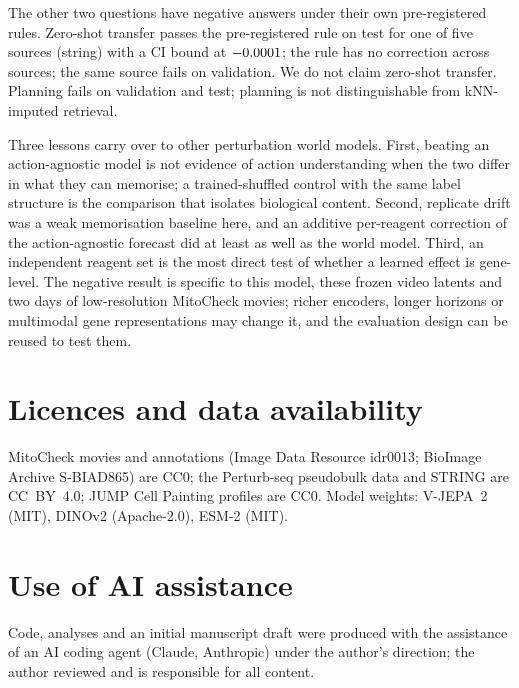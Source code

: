 The other two questions have negative answers under their own pre-registered rules. Zero-shot
transfer passes the pre-registered rule on test for one of five sources (string) with a CI bound
at $-0.0001$; the rule has no correction across sources; the same source fails
on validation. We do not claim zero-shot transfer. Planning fails on validation and test;
planning is not distinguishable from kNN-imputed retrieval.

Three lessons carry over to other perturbation world models. First, beating an action-agnostic
model is not evidence of action understanding when the two differ in what they can memorise; a
trained-shuffled control with the same label structure is the comparison that isolates
biological content. Second, replicate drift was a weak memorisation baseline here, and an
additive per-reagent correction of the action-agnostic forecast did at least as well as the
world model. Third, an independent reagent set is the most direct test of whether a learned
effect is gene-level. The negative result is specific to this model, these frozen video latents
and two days of low-resolution MitoCheck movies; richer encoders, longer horizons or multimodal
gene representations may change it, and the evaluation design can be reused to test them.

\section*{Licences and data availability}

MitoCheck movies and annotations (Image Data Resource idr0013; BioImage Archive S-BIAD865) are
CC0; the Perturb-seq pseudobulk data and STRING are CC~BY~4.0; JUMP Cell Painting profiles are
CC0. Model weights: V-JEPA~2 (MIT), DINOv2 (Apache-2.0), ESM-2 (MIT).

\section*{Use of AI assistance}

Code, analyses and an initial manuscript draft were produced with the assistance of an AI coding
agent (Claude, Anthropic) under the author's direction; the author reviewed and is responsible
for all content. 
